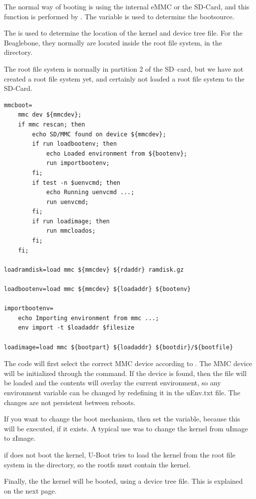 \clearpage
The normal way of booting is using the internal eMMC or the SD-Card, and
this function is performed by . The  variable
is used to determine the bootsource.

The  is used to determine the location of the kernel and device tree file.
For the Beaglebone, they normally are located inside the root file system, in the  directory.

The root file system is normally in partition 2 of the SD--card, but we have not created
a root file system yet, and certainly not loaded a root file system to the SD-Card.

\begin{lstlisting}
mmcboot=
	mmc dev ${mmcdev};
	if mmc rescan; then
		echo SD/MMC found on device ${mmcdev};
		if run loadbootenv; then
			echo Loaded environment from ${bootenv};
			run importbootenv;
		fi;
		if test -n $uenvcmd; then 
			echo Running uenvcmd ...;
			run uenvcmd;
		fi;
		if run loadimage; then
			run mmcloados;
		fi;
	fi;

loadramdisk=load mmc ${mmcdev} ${rdaddr} ramdisk.gz

loadbootenv=load mmc ${mmcdev} ${loadaddr} ${bootenv}

importbootenv=
	echo Importing environment from mmc ...; 
	env import -t $loadaddr $filesize

loadimage=load mmc ${bootpart} ${loadaddr} ${bootdir}/${bootfile}
\end{lstlisting}

The  code will first select the correct MMC device according to .
The MMC device will be initialized through the  command.
If the device is found, then the file  will be loaded and the contents
will overlay the current environment, so any environment variable can be 
changed by redefining it in the uEnv.txt file. The changes are not persistent between reboots.

If you want to change the boot mechanism, then set the  variable,
because this will be executed, if it exists.
A typical use was to change the kernel from uImage to zImage.

if  does not boot the kernel, U-Boot tries to load the kernel from the root file system
in the  directory, so the rootfs must contain the kernel.

Finally, the the kernel will be booted, using a device tree file.
This is explained on the next page.

